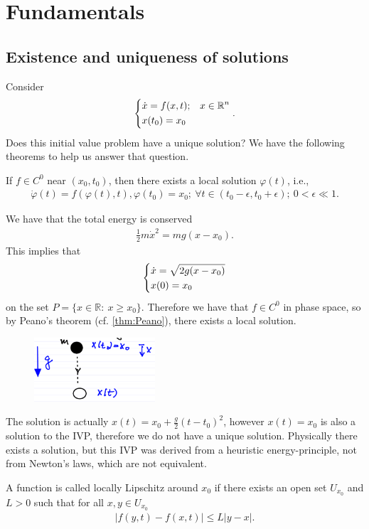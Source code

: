 \chapter{Fundamentals}
\section{Existence and uniqueness of solutions}
Consider  
\begin{align}
\begin{dcases}
	\dot{x} = f(x,t); & x \in \mathbb{R}^{n} \\
	x(t_0) = x_0
\end{dcases}.
\end{align}
Does this initial value problem have a unique solution? We have the following theorems to help us answer that question.
\begin{theorem}[Peano]
	\label{thm:Peano}
	If $f\in C^0$ near $(x_0, t_0)$, then there exists a local solution $\varphi(t)$, i.e., 
\begin{align}
	\dot{\varphi}(t) = f(\varphi(t), t), \varphi(t_0) = x_0;\ \forall  t\in (t_0 - \epsilon, t_0 + \epsilon);\ 0<  \epsilon \ll 1.
\end{align}
\end{theorem}
\begin{ex}
	We have that the total energy is conserved
	\begin{align}
		\frac{1}{2} m \dot{x}^2 = mg(x-x_0).
	\end{align}
This implies that
\begin{align}
	\begin{dcases}
		\dot{x} = \sqrt{2g(x-x_0)} \\
		x(0) = x_0
	\end{dcases}
\end{align}
on the set $P = \{ x \in \mathbb{R}:\ x \geq x_0\}$. Therefore we have that $f\in C^0$ in phase space, so by Peano's theorem (cf. \ref{thm:Peano}), there exists a local solution.
	\begin{figure}[h]
		\centering
		\includegraphics[width=0.4\textwidth]{figures/ch1/1freefall.png}
	\end{figure}
	The solution is actually $x(t) = x_0 + \frac{g}{2}(t-t_0)^2$, however $x(t) = x_0$ is also a solution to the IVP, therefore we do not have a unique solution. Physically there exists a solution, but this IVP was derived from a heuristic energy-principle, not from Newton's laws, which are not equivalent.
\end{ex}
\begin{definition}
A function is called locally Lipschitz around $x_0$ if there exists an open set $U_{x_0}$ and $L>0$ such that for all $x,y \in U_{x_0}$
\begin{align}
	\boxed{\left| f(y,t) - f(x,t)\right| \leq L |y - x|.}
\end{align}
\end{definition}

